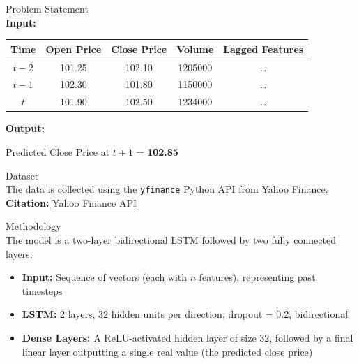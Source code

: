 \documentclass[9pt]{beamer}
\begin{document}
\begin{frame}{Problem Statement}
    \\[0.3cm]

    \textbf{Input:}
    \begin{table}[h!]
        \centering
        \begin{tabular}{|c|c|c|c|c|}
            \hline
            \textbf{Time}   & \textbf{Open Price}      & \textbf{Close Price} &
            \textbf{Volume} & \textbf{Lagged Features}
            \\
            \hline
            $t-2$           & 101.25                   & 102.10               &
            1205000         & \dots
            \\
            $t-1$           & 102.30                   & 101.80               &
            1150000         & \dots
            \\
            $t$             & 101.90                   & 102.50               &
            1234000         & \dots
            \\
            \hline
        \end{tabular}
    \end{table}

    \textbf{Output:}\\
    \begin{center}
        Predicted Close Price at $t+1$ = \textbf{102.85}
    \end{center}

\end{frame}

\begin{frame}{Dataset}
    \\[0.3cm]
    The data is collected using the \texttt{yfinance} Python API from Yahoo
    Finance.\\[0.15cm]
    \textbf{Citation:}
    \href{https://pypi.org/project/yfinance/}{Yahoo Finance API}

\end{frame}

\begin{frame}{Methodology}
    \\[0.3cm]
    The model is a two-layer bidirectional LSTM followed by two fully connected
    layers:
    \begin{itemize}
        \item \textbf{Input:} Sequence of vectors (each with $n$ features),
              representing past timesteps
        \item \textbf{LSTM:} 2 layers, 32 hidden units per direction, dropout =
              0.2, bidirectional
        \item \textbf{Dense Layers:} A ReLU-activated hidden layer of size 32,
              followed by a final linear layer outputting a single real value
              (the predicted
              close price)
    \end{itemize}
\end{frame}
\end{document}
